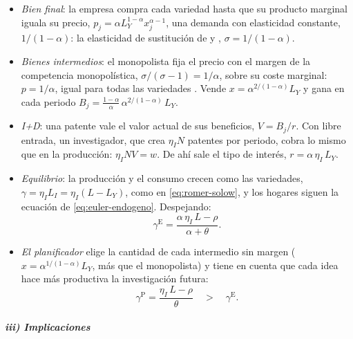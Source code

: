 \documentclass[11pt]{article}
\begin{document}
\begin{itemize}
\item \emph{Bien final}: la empresa compra cada variedad hasta que su producto marginal iguala su precio, $p_j=\alpha L_Y^{1-\alpha}x_j^{\alpha-1}$, una demanda con elasticidad constante, $1/(1-\alpha)$: la elasticidad de sustitución de  y , $\sigma=1/(1-\alpha)$.
\item \emph{Bienes intermedios}: el monopolista fija el precio con el margen de la competencia monopolística, $\sigma/(\sigma-1)=1/\alpha$, sobre su coste marginal: $p=1/\alpha$, igual para todas las variedades . Vende $x=\alpha^{2/(1-\alpha)}L_Y$ y gana en cada periodo $B_j=\frac{1-\alpha}{\alpha}\,\alpha^{2/(1-\alpha)}\,L_Y$.
\item \emph{I+D}: una patente vale el valor actual de sus beneficios, $V=B_j/r$. Con libre entrada, un investigador, que crea $\eta_IN$ patentes por periodo, cobra lo mismo que en la producción: $\eta_INV=w$. De ahí sale el tipo de interés, $r=\alpha\,\eta_I\,L_Y$.
\item \emph{Equilibrio}: la producción y el consumo crecen como las variedades, $\gamma=\eta_IL_I=\eta_I(L-L_Y)$, como en \eqref{eq:romer-solow}, y los hogares siguen la ecuación de  \eqref{eq:euler-endogeno}. Despejando:
  \begin{equation}
  \gamma^{\mathrm E}=\frac{\alpha\,\eta_I\,L-\rho}{\alpha+\theta}.\label{eq:romer-gamma}
  \end{equation}
\item \emph{El planificador} elige la cantidad de cada intermedio sin margen ($x=\alpha^{1/(1-\alpha)}L_Y$, más que el monopolista) y tiene en cuenta que cada idea hace más productiva la investigación futura:
  \[\gamma^{\mathrm P}=\frac{\eta_I\,L-\rho}{\theta}\quad>\quad\gamma^{\mathrm E}.\]
\end{itemize}

\subparagraph{iii) Implicaciones}
\end{document}
